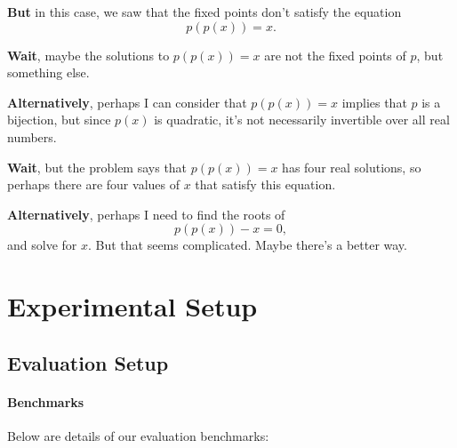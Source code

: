 \begin{tcolorbox}[label=extract:reward-short-term, colback=lightgray!10, colframe=black, title={Short-Term Thinking ($\gamma_c = 0.99$)}]
\textbf{But} in this case, we saw that the fixed points don't satisfy the equation 
\[
p(p(x)) = x.
\]

\textbf{Wait}, maybe the solutions to \( p(p(x)) = x \) are not the fixed points of \( p \), but something else.

\textbf{Alternatively}, perhaps I can consider that \( p(p(x)) = x \) implies that \( p \) is a bijection, 
but since \( p(x) \) is quadratic, it's not necessarily invertible over all real numbers.

\textbf{Wait}, but the problem says that \( p(p(x)) = x \) has four real solutions, so perhaps there are four 
values of \( x \) that satisfy this equation.

\textbf{Alternatively}, perhaps I need to find the roots of 
\[
p(p(x)) - x = 0,
\]
and solve for \( x \). But that seems complicated. Maybe there's a better way.
\end{tcolorbox}

\newpage
\section{Experimental Setup}

\subsection{Evaluation Setup} \label{app:eval-setup}

\paragraph{Benchmarks} Below are details of our evaluation benchmarks:

